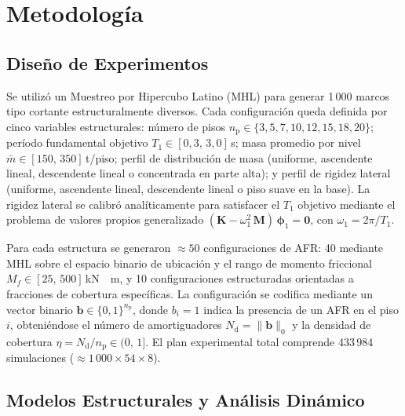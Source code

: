 \documentclass[preprint,12pt,authoryear]{elsarticle}
\newcommand{\nd}{N_{\mathrm{d}}}
\newcommand{\np}{n_{\mathrm{p}}}              %
\newcommand{\etad}{\eta}
\newcommand{\Mf}{M_{\!f}}
\newcommand{\KM}{\,\si{kN{\cdot}m}}
\begin{document}
\section{Metodología}
\label{sec:method}

\subsection{Diseño de Experimentos}
\label{sec:method:doe}

Se utilizó un Muestreo por Hipercubo Latino (MHL) \citep{McKay1979} para generar
1\,000 marcos tipo cortante estructuralmente diversos. Cada configuración queda
definida por cinco variables estructurales: número de pisos $\np \in \{3, 5, 7,
10, 12, 15, 18, 20\}$; período fundamental objetivo $T_1 \in [0{,}3,\,3{,}0]$\,s;
masa promedio por nivel $\bar{m} \in [150,\,350]$\,t/piso; perfil de distribución
de masa (uniforme, ascendente lineal, descendente lineal o concentrada en parte
alta); y perfil de rigidez lateral (uniforme, ascendente lineal, descendente
lineal o piso suave en la base). La rigidez lateral se calibró analíticamente
para satisfacer el $T_1$ objetivo mediante el problema de valores propios
generalizado $(\bm{K} - \omega_1^2\,\bm{M})\,\bm{\phi}_1 = \bm{0}$, con
$\omega_1 = 2\pi/T_1$.

Para cada estructura se generaron $\approx 50$ configuraciones de AFR: 40
mediante MHL sobre el espacio binario de ubicación y el rango de momento
friccional $\Mf \in [25,\,500]$\KM, y 10 configuraciones estructuradas
orientadas a fracciones de cobertura específicas. La configuración se codifica
mediante un vector binario $\bm{b} \in \{0,1\}^{\np}$, donde $b_i = 1$ indica
la presencia de un AFR en el piso $i$, obteniéndose el número de amortiguadores
$\nd = \|\bm{b}\|_0$ y la densidad de cobertura $\etad = \nd/\np \in (0,\,1]$.
El plan experimental total comprende 433\,984 simulaciones
($\approx 1\,000 \times 54 \times 8$).

\subsection{Modelos Estructurales y Análisis Dinámico}
\label{sec:method:modelo}
\end{document}
